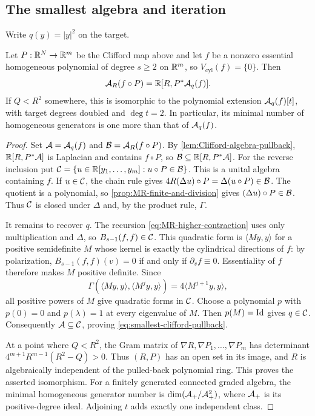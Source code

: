 \subsection{The smallest algebra and iteration}
\label{subsec:clifford-smallest-algebra}

Write $q(y)=|y|^2$ on the target.

\begin{theorem}
\label{thm:smallest-clifford-pullback}
Let $P:\mathbb R^N\to\mathbb R^m$ be the Clifford map above and let $f$ be a
nonzero essential homogeneous polynomial of degree $s\ge2$ on
$\mathbb R^m$, so $V_{\mathrm{cyl}}(f)=\{0\}$. Then
\begin{equation}\label{eq:smallest-clifford-pullback}
 \mathcal A_R(f\circ P)=\mathbb R[R,P^*\mathcal A_q(f)].
\end{equation}
If $Q<R^2$ somewhere, this is isomorphic to the polynomial extension
$\mathcal A_q(f)[t]$, with target degrees doubled and $\deg t=2$.
In particular, its minimal number of homogeneous generators is one
more than that of $\mathcal A_q(f)$.
\end{theorem}

\begin{proof}
Set $\mathcal A=\mathcal A_q(f)$ and $\mathcal B=\mathcal A_R(f\circ P)$.
By \cref{lem:Clifford-algebra-pullback}, $\mathbb R[R,P^*\mathcal A]$ is Laplacian
and contains $f\circ P$, so $\mathcal B\subseteq\mathbb R[R,P^*\mathcal A]$.
For the reverse inclusion put \(\mathcal C=\{u\in\mathbb R[y_1,\ldots,y_m]:u\circ P\in\mathcal B\}\).
This is a unital algebra containing $f$. If $u\in\mathcal C$, the chain
rule gives $4R(\Delta u)\circ P=\Delta(u\circ P)\in\mathcal B$.
The quotient is a polynomial, so
\cref{prop:MR-finite-and-division} gives $(\Delta u)\circ P\in\mathcal B$.
Thus $\mathcal C$ is closed under $\Delta$ and, by the product rule, $\Gamma$.

It remains to recover $q$. The recursion
\eqref{eq:MR-higher-contraction} uses only multiplication and
$\Delta$, so $B_{s-1}(f,f)\in\mathcal C$. This quadratic form is
$\langle My,y\rangle$ for a positive semidefinite $M$ whose kernel
is exactly the cylindrical directions of $f$: by polarization,
$B_{s-1}(f,f)(v)=0$ if and only if $\partial_vf\equiv0$.
Essentiality of $f$ therefore makes $M$ positive definite. Since
\[
 \Gamma(\langle My,y\rangle,\langle M^jy,y\rangle)
       =4\langle M^{j+1}y,y\rangle,
\]
all positive powers of $M$ give quadratic forms in $\mathcal C$.
Choose a polynomial $p$ with $p(0)=0$ and $p(\lambda)=1$ at every
eigenvalue of $M$. Then $p(M)=\operatorname{Id}$ gives $q\in\mathcal C$.
Consequently $\mathcal A\subseteq\mathcal C$, proving
\eqref{eq:smallest-clifford-pullback}.

At a point where $Q<R^2$, the Gram matrix of
$\nabla R,\nabla P_1,\ldots,\nabla P_m$ has determinant \(4^{m+1}R^{m-1}(R^2-Q)>0\).
Thus $(R,P)$ has an open set in its
image, and $R$ is algebraically independent of the pulled-back
polynomial ring. This proves the asserted isomorphism. For a finitely
generated connected graded algebra, the minimal homogeneous generator
number is $\dim(\mathcal A_+/\mathcal A_+^2)$, where $\mathcal A_+$ is its positive-degree
ideal. Adjoining $t$ adds exactly one independent class.
\end{proof}


